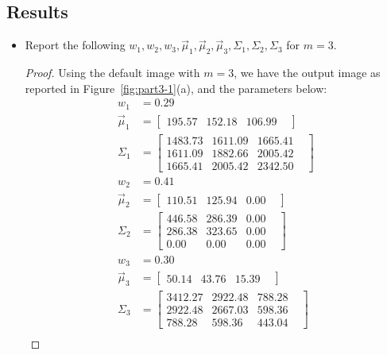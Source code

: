 \documentclass[12pt]{article}
\newcommand{\1}{\mathbf{1}}
\begin{document}
{\subsection{Results}
\begin{itemize}
  \item Report the following  $w_1, w_2, w_3, \vec{\mu}_1, \vec{\mu}_2, \vec{\mu}_3, \Sigma_1, \Sigma_2, \Sigma_3$ for $m=3$.
  \begin{proof}
    Using the default image with $m=3$, we have the output image as reported in Figure~\ref{fig:part3-1}(a), and the parameters below:
      \begin{align*}
w_{1} & = 0.29 \\
\vec{\mu}_{1} &= \begin{bmatrix} 195.57 &  152.18 &  106.99 &  \end{bmatrix} \\
\Sigma_{1} &= \begin{bmatrix} 1483.73 &  1611.09 &  1665.41 &  \\1611.09 &  1882.66 &  2005.42 &  \\1665.41 &  2005.42 &  2342.50 &  \end{bmatrix} \\
w_{2} & = 0.41 \\
\vec{\mu}_{2} &= \begin{bmatrix} 110.51 &  125.94 &  0.00 &  \end{bmatrix} \\
\Sigma_{2} &= \begin{bmatrix} 446.58 &  286.39 &  0.00 &  \\286.38 &  323.65 &  0.00 &  \\0.00 &  0.00 &  0.00 &  \end{bmatrix} \\
w_{3} & = 0.30 \\
\vec{\mu}_{3} &= \begin{bmatrix} 50.14 &  43.76 &  15.39 &  \end{bmatrix} \\
\Sigma_{3} &= \begin{bmatrix} 3412.27 &  2922.48 &  788.28 &  \\2922.48 &  2667.03 &  598.36 &  \\788.28 &  598.36 &  443.04 &  \end{bmatrix} \\
\end{align*}


\end{proof}
\end{itemize}}
\end{document}
